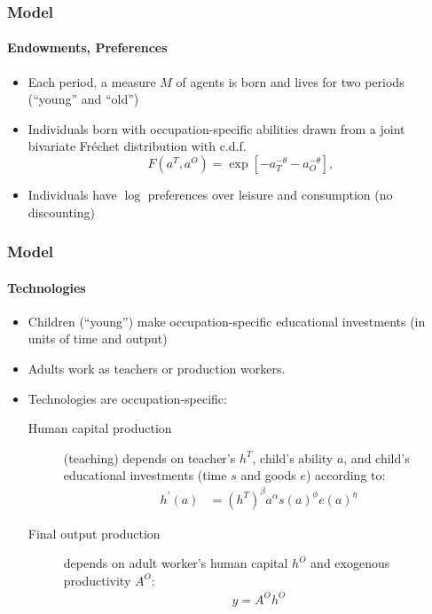 \documentclass[11pt]{beamer}
\begin{document}
\begin{frame}
\frametitle{Model}
\framesubtitle{Endowments, Preferences}
\begin{itemize}
  \item Each period, a measure $M$ of agents is born and lives for two periods (``young'' and ``old'')
  \item Individuals born with occupation-specific abilities drawn from a joint bivariate Fr\'echet distribution with c.d.f.
  \begin{equation*}
\label{ }
F(a^T,a^O) = \exp \left[ - a_T^{-\theta} - a_O^{-\theta} \right],
\end{equation*}
  \item Individuals have $\log$ preferences over leisure and consumption (no discounting)
\end{itemize}
\end{frame}

\begin{frame}
\frametitle{Model}
\framesubtitle{Technologies}
\begin{itemize}
  \item Children (``young'') make occupation-specific educational investments (in units of time and output)
  \item Adults work as \alert{teachers} or \alert{production workers}.
  \item Technologies are occupation-specific:
  \begin{description}
  \item[Human capital production] (teaching) depends on teacher's $h^T$, child's ability $a$, and child's educational investments (time $s$ and goods $e$) according to:
  \begin{align*}
\label{}
h^{'}(a) & = \left( h^T\right)^\beta a^\alpha s\left(a\right)^\phi e(a)^\eta
\end{align*}
  \item[Final output production] depends on adult worker's human capital $h^O$ and exogenous productivity $A^O$:
    \begin{align*}
\label{}
y = A^O h^O
\end{align*}
\end{description}
\end{itemize}
\end{frame}
\end{document}
